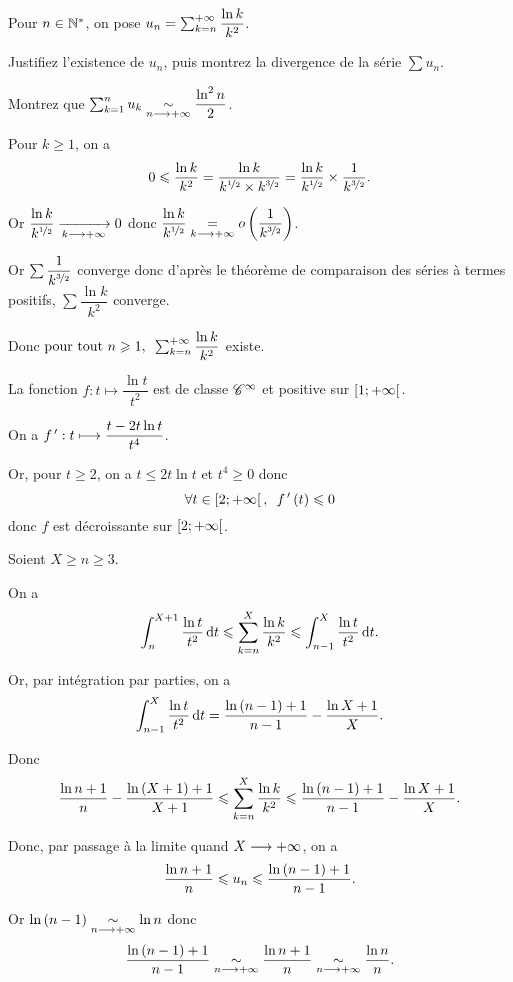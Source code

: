 \begin{exo}
Pour \(n\in\Ns\), on pose \(u_n=\sum_{k=n}^{\pinf}\dfrac{\ln k}{k^2}\).

Justifiez l'existence de \(u_n\), puis montrez la divergence de la série \(\sum u_n\).

Montrez que \(\sum_{k=1}^nu_k\simqd{n\to\pinf}\dfrac{\ln^2n}{2}\).
\end{exo}

\begin{corr}
Pour \(k\geq1\), on a \[0\leq\dfrac{\ln k}{k^2}=\dfrac{\ln k}{k^{\nicefrac{1}{2}}\times k^{\nicefrac{3}{2}}}=\dfrac{\ln k}{k^{\nicefrac{1}{2}}}\times\dfrac{1}{k^{\nicefrac{3}{2}}}.\]

Or \(\dfrac{\ln k}{k^{\nicefrac{1}{2}}}\tendqd{k\to\pinf}0\) donc \(\dfrac{\ln k}{k^{\nicefrac{1}{2}}}\egqd{k\to\pinf}\o{\dfrac{1}{k^{\nicefrac{3}{2}}}}\).

Or \(\sum\dfrac{1}{k^{\nicefrac{3}{2}}}\) converge donc d'après le théorème de comparaison des séries à termes positifs, \(\sum\dfrac{\ln k}{k^2}\) converge.

Donc \(\quantifs{\tpt n\geq1}\sum_{k=n}^{\pinf}\dfrac{\ln k}{k^2}\) existe.

La fonction \(f:t\mapsto\dfrac{\ln t}{t^2}\) est de classe \(\classe{\infty}\) et positive sur \(\intervie{1}{\pinf}\).

On a \(f\prim:t\mapsto\dfrac{t-2t\ln t}{t^4}\).

Or, pour \(t\geq2\), on a \(t\leq2t\ln t\) et \(t^4\geq0\) donc \[\quantifs{\forall t\in\intervie{2}{\pinf}}f\prim\paren{t}\leq0\] donc \(f\) est décroissante sur \(\intervie{2}{\pinf}\).

Soient \(X\geq n\geq3\).

On a \[\int_n^{X+1}\dfrac{\ln t}{t^2}\odif{t}\leq\sum_{k=n}^X\dfrac{\ln k}{k^2}\leq\int_{n-1}^X\dfrac{\ln t}{t^2}\odif{t}.\]

Or, par intégration par parties, on a \[\int_{n-1}^X\dfrac{\ln t}{t^2}\odif{t}=\dfrac{\ln\paren{n-1}+1}{n-1}-\dfrac{\ln X+1}{X}.\]

Donc \[\dfrac{\ln n+1}{n}-\dfrac{\ln\paren{X+1}+1}{X+1}\leq\sum_{k=n}^X\dfrac{\ln k}{k^2}\leq\dfrac{\ln\paren{n-1}+1}{n-1}-\dfrac{\ln X+1}{X}.\]

Donc, par passage à la limite quand \(X\to\pinf\), on a \[\dfrac{\ln n+1}{n}\leq u_n\leq\dfrac{\ln\paren{n-1}+1}{n-1}.\]

Or \(\ln\paren{n-1}\simqd{n\to\pinf}\ln n\) donc \[\dfrac{\ln\paren{n-1}+1}{n-1}\simqd{n\to\pinf}\dfrac{\ln n+1}{n}\simqd{n\to\pinf}\dfrac{\ln n}{n}.\]


\end{corr}
